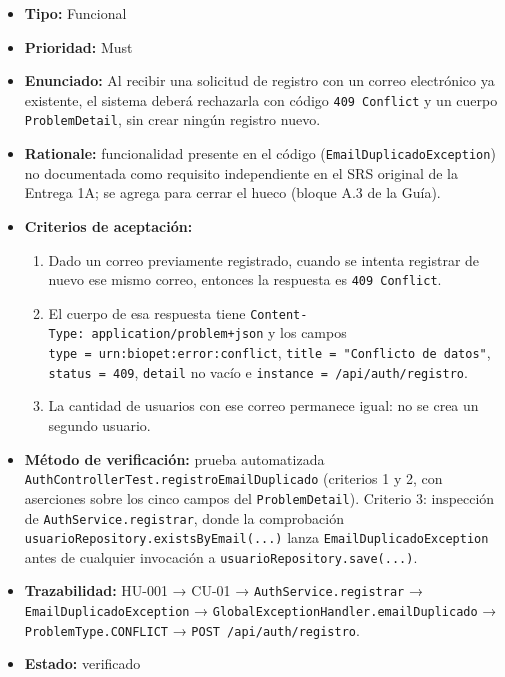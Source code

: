 \documentclass[
  spanish,
]{article}
\providecommand{\tightlist}{%
  \setlength{\itemsep}{0pt}\setlength{\parskip}{0pt}}
\begin{document}
\begin{itemize}
\tightlist
\item
  \textbf{Tipo:} Funcional
\item
  \textbf{Prioridad:} Must
\item
  \textbf{Enunciado:} Al recibir una solicitud de registro con un correo
  electrónico ya existente, el sistema deberá rechazarla con código
  \texttt{409\ Conflict} y un cuerpo \texttt{Problem\allowbreak{}Detail}, sin crear
  ningún registro nuevo.
\item
  \textbf{Rationale:} funcionalidad presente en el código
  (\texttt{Email\allowbreak{}Duplicado\allowbreak{}Exception}) no documentada como requisito
  independiente en el SRS original de la Entrega 1A; se agrega para
  cerrar el hueco (bloque A.3 de la Guía).
\item
  \textbf{Criterios de aceptación:}

  \begin{enumerate}
  \def\labelenumi{\arabic{enumi}.}
  \tightlist
  \item
    Dado un correo previamente registrado, cuando se intenta registrar
    de nuevo ese mismo correo, entonces la respuesta es
    \texttt{409\ Conflict}.
  \item
    El cuerpo de esa respuesta tiene
    \texttt{Content-\allowbreak{}Type:\ application/\allowbreak{}problem+json} y los campos
    \texttt{type\ =\ urn:biopet:\allowbreak{}error:conflict},
    \texttt{title\ =\ "Conflicto\ d\allowbreak{}e\ datos"}, \texttt{status\ =\ 409},
    \texttt{detail} no vacío e \texttt{instance\ =\ /\allowbreak{}api/\allowbreak{}auth/\allowbreak{}registro}.
  \item
    La cantidad de usuarios con ese correo permanece igual: no se crea
    un segundo usuario.
  \end{enumerate}
\item
  \textbf{Método de verificación:} prueba automatizada
  \texttt{Auth\allowbreak{}Controller\allowbreak{}Test.\allowbreak{}registro\allowbreak{}Email\allowbreak{}Duplicado} (criterios 1 y 2,
  con aserciones sobre los cinco campos del \texttt{Problem\allowbreak{}Detail}).
  Criterio 3: inspección de \texttt{Auth\allowbreak{}Service.\allowbreak{}registrar}, donde la
  comprobación \texttt{usuario\allowbreak{}Repository.\allowbreak{}exists\allowbreak{}By\allowbreak{}Email(...)} lanza
  \texttt{Email\allowbreak{}Duplicado\allowbreak{}Exception} antes de cualquier invocación a
  \texttt{usuario\allowbreak{}Repository.\allowbreak{}save(...)}.
\item
  \textbf{Trazabilidad:} HU-001 → CU-01 → \texttt{Auth\allowbreak{}Service.\allowbreak{}registrar}
  → \texttt{Email\allowbreak{}Duplicado\allowbreak{}Exception} →
  \texttt{Global\allowbreak{}Exception\allowbreak{}Handler.\allowbreak{}email\allowbreak{}Duplicado} →
  \texttt{Problem\allowbreak{}Type.\allowbreak{}CONFLICT} → \texttt{POST\ /\allowbreak{}api/\allowbreak{}auth/\allowbreak{}registro}.
\item
  \textbf{Estado:} verificado
\end{itemize}
\end{document}
